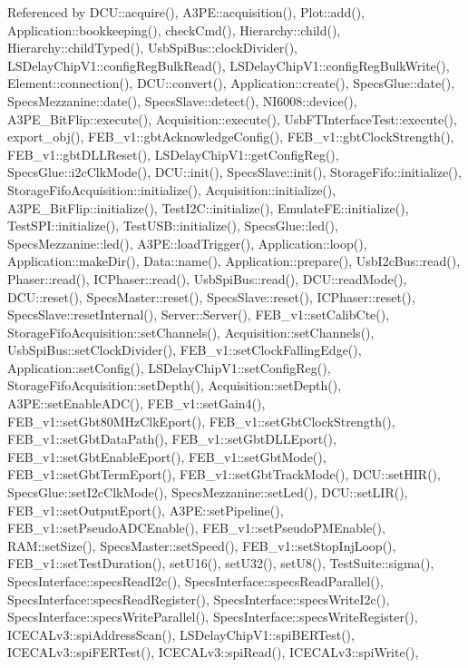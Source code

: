 Referenced by D\+C\+U\+::acquire(), A3\+P\+E\+::acquisition(), Plot\+::add(), Application\+::bookkeeping(), check\+Cmd(), Hierarchy\+::child(), Hierarchy\+::child\+Typed(), Usb\+Spi\+Bus\+::clock\+Divider(), L\+S\+Delay\+Chip\+V1\+::config\+Reg\+Bulk\+Read(), L\+S\+Delay\+Chip\+V1\+::config\+Reg\+Bulk\+Write(), Element\+::connection(), D\+C\+U\+::convert(), Application\+::create(), Specs\+Glue\+::date(), Specs\+Mezzanine\+::date(), Specs\+Slave\+::detect(), N\+I6008\+::device(), A3\+P\+E\+\_\+\+Bit\+Flip\+::execute(), Acquisition\+::execute(), Usb\+F\+T\+Interface\+Test\+::execute(), export\+\_\+obj(), F\+E\+B\+\_\+v1\+::gbt\+Acknowledge\+Config(), F\+E\+B\+\_\+v1\+::gbt\+Clock\+Strength(), F\+E\+B\+\_\+v1\+::gbt\+D\+L\+L\+Reset(), L\+S\+Delay\+Chip\+V1\+::get\+Config\+Reg(), Specs\+Glue\+::i2c\+Clk\+Mode(), D\+C\+U\+::init(), Specs\+Slave\+::init(), Storage\+Fifo\+::initialize(), Storage\+Fifo\+Acquisition\+::initialize(), Acquisition\+::initialize(), A3\+P\+E\+\_\+\+Bit\+Flip\+::initialize(), Test\+I2\+C\+::initialize(), Emulate\+F\+E\+::initialize(), Test\+S\+P\+I\+::initialize(), Test\+U\+S\+B\+::initialize(), Specs\+Glue\+::led(), Specs\+Mezzanine\+::led(), A3\+P\+E\+::load\+Trigger(), Application\+::loop(), Application\+::make\+Dir(), Data\+::name(), Application\+::prepare(), Usb\+I2c\+Bus\+::read(), Phaser\+::read(), I\+C\+Phaser\+::read(), Usb\+Spi\+Bus\+::read(), D\+C\+U\+::read\+Mode(), D\+C\+U\+::reset(), Specs\+Master\+::reset(), Specs\+Slave\+::reset(), I\+C\+Phaser\+::reset(), Specs\+Slave\+::reset\+Internal(), Server\+::\+Server(), F\+E\+B\+\_\+v1\+::set\+Calib\+Cte(), Storage\+Fifo\+Acquisition\+::set\+Channels(), Acquisition\+::set\+Channels(), Usb\+Spi\+Bus\+::set\+Clock\+Divider(), F\+E\+B\+\_\+v1\+::set\+Clock\+Falling\+Edge(), Application\+::set\+Config(), L\+S\+Delay\+Chip\+V1\+::set\+Config\+Reg(), Storage\+Fifo\+Acquisition\+::set\+Depth(), Acquisition\+::set\+Depth(), A3\+P\+E\+::set\+Enable\+A\+D\+C(), F\+E\+B\+\_\+v1\+::set\+Gain4(), F\+E\+B\+\_\+v1\+::set\+Gbt80\+M\+Hz\+Clk\+Eport(), F\+E\+B\+\_\+v1\+::set\+Gbt\+Clock\+Strength(), F\+E\+B\+\_\+v1\+::set\+Gbt\+Data\+Path(), F\+E\+B\+\_\+v1\+::set\+Gbt\+D\+L\+L\+Eport(), F\+E\+B\+\_\+v1\+::set\+Gbt\+Enable\+Eport(), F\+E\+B\+\_\+v1\+::set\+Gbt\+Mode(), F\+E\+B\+\_\+v1\+::set\+Gbt\+Term\+Eport(), F\+E\+B\+\_\+v1\+::set\+Gbt\+Track\+Mode(), D\+C\+U\+::set\+H\+I\+R(), Specs\+Glue\+::set\+I2c\+Clk\+Mode(), Specs\+Mezzanine\+::set\+Led(), D\+C\+U\+::set\+L\+I\+R(), F\+E\+B\+\_\+v1\+::set\+Output\+Eport(), A3\+P\+E\+::set\+Pipeline(), F\+E\+B\+\_\+v1\+::set\+Pseudo\+A\+D\+C\+Enable(), F\+E\+B\+\_\+v1\+::set\+Pseudo\+P\+M\+Enable(), R\+A\+M\+::set\+Size(), Specs\+Master\+::set\+Speed(), F\+E\+B\+\_\+v1\+::set\+Stop\+Inj\+Loop(), F\+E\+B\+\_\+v1\+::set\+Test\+Duration(), set\+U16(), set\+U32(), set\+U8(), Test\+Suite\+::sigma(), Specs\+Interface\+::specs\+Read\+I2c(), Specs\+Interface\+::specs\+Read\+Parallel(), Specs\+Interface\+::specs\+Read\+Register(), Specs\+Interface\+::specs\+Write\+I2c(), Specs\+Interface\+::specs\+Write\+Parallel(), Specs\+Interface\+::specs\+Write\+Register(), I\+C\+E\+C\+A\+Lv3\+::spi\+Address\+Scan(), L\+S\+Delay\+Chip\+V1\+::spi\+B\+E\+R\+Test(), I\+C\+E\+C\+A\+Lv3\+::spi\+F\+E\+R\+Test(), I\+C\+E\+C\+A\+Lv3\+::spi\+Read(), I\+C\+E\+C\+A\+Lv3\+::spi\+Write(), 